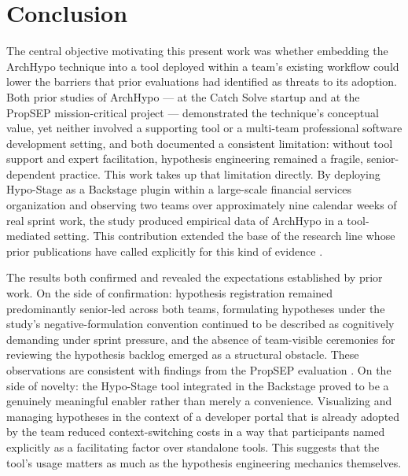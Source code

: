
\chapter{Conclusion}
\label{ch:conclusion}
\label{chap:conclusion}

The central objective motivating this present work was whether embedding the ArchHypo
technique into a tool deployed within a team's existing workflow could lower the barriers
that prior evaluations had identified as threats to its adoption. Both prior studies of
ArchHypo --- at the Catch Solve startup \citep{silva2024ieeesw} and at the PropSEP
mission-critical project \citep{silva2024tse} --- demonstrated the technique's conceptual
value, yet neither involved a supporting tool or a multi-team professional software development setting,
and both documented a consistent limitation: without tool support and expert
facilitation, hypothesis engineering remained a fragile, senior-dependent practice. This
work takes up that limitation directly. By deploying Hypo-Stage as a Backstage plugin
within a large-scale financial services organization and observing two teams over approximately nine calendar weeks of real sprint work, the study produced empirical data of ArchHypo in
a tool-mediated setting. This contribution extended the base of the research line whose prior publications have called explicitly for this kind of evidence \citep{silva2024patterns}.

The results both confirmed and revealed the expectations established by prior work.
On the side of confirmation: hypothesis registration remained predominantly senior-led
across both teams, formulating hypotheses under the study's negative-formulation convention
continued to be described as cognitively demanding under sprint pressure, and the absence of team-visible ceremonies for reviewing
the hypothesis backlog emerged as a structural obstacle. These observations are consistent with findings
from the PropSEP evaluation \citep{silva2024tse}. On the side of novelty: the
Hypo-Stage tool integrated in the Backstage proved to be a genuinely meaningful enabler rather than merely a
convenience. Visualizing and managing hypotheses in the context of a developer portal 
that is already adopted by the team reduced context-switching costs in a way that
participants named explicitly as a facilitating factor over standalone tools. This
suggests that the tool's usage matters as much as the hypothesis engineering
mechanics themselves.

